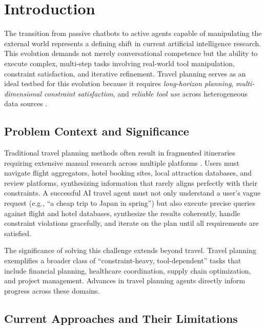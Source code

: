 \documentclass[preprint,review,12pt]{elsarticle}
\begin{document}
\section{Introduction}
\label{sec:introduction}

The transition from passive chatbots to active agents capable of manipulating the external world represents a defining shift in current artificial intelligence research. This evolution demands not merely conversational competence but the ability to execute complex, multi-step tasks involving real-world tool manipulation, constraint satisfaction, and iterative refinement. Travel planning serves as an ideal testbed for this evolution because it requires \textit{long-horizon planning}, \textit{multi-dimensional constraint satisfaction}, and \textit{reliable tool use} across heterogeneous data sources \citep{yang2025planyourtravel, shen2025triptailor}.

\subsection{Problem Context and Significance}

Traditional travel planning methods often result in fragmented itineraries requiring extensive manual research across multiple platforms \citep{dhote2025smart, anitha2025intelligent}. Users must navigate flight aggregators, hotel booking sites, local attraction databases, and review platforms, synthesizing information that rarely aligns perfectly with their constraints. A successful AI travel agent must not only understand a user's vague request (e.g., ``a cheap trip to Japan in spring'') but also execute precise queries against flight and hotel databases, synthesize the results coherently, handle constraint violations gracefully, and iterate on the plan until all requirements are satisfied.

The significance of solving this challenge extends beyond travel. Travel planning exemplifies a broader class of ``constraint-heavy, tool-dependent'' tasks that include financial planning, healthcare coordination, supply chain optimization, and project management. Advances in travel planning agents directly inform progress across these domains.

\subsection{Current Approaches and Their Limitations}
\end{document}
